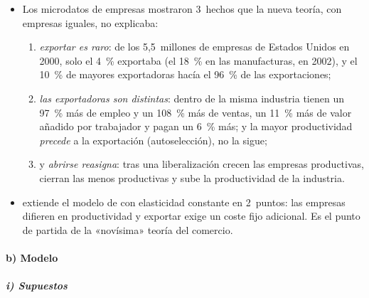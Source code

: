 \documentclass[11pt]{article}
\begin{document}
\begin{itemize}
\item Los microdatos de empresas mostraron 3~hechos que la nueva teoría, con empresas iguales, no explicaba:
  \begin{enumerate}
  \item \emph{exportar es raro}: de los 5,5~millones de empresas de Estados Unidos en 2000, solo el 4~\% exportaba (el 18~\% en las manufacturas, en 2002), y el 10~\% de mayores exportadoras hacía el 96~\% de las exportaciones\nocite{BernardJensenReddingSchott2007Firms};
  \item \emph{las exportadoras son distintas}: dentro de la misma industria tienen un 97~\% más de empleo y un 108~\% más de ventas, un 11~\% más de valor añadido por trabajador y pagan un 6~\% más; y la mayor productividad \emph{precede} a la exportación (autoselección), no la sigue\nocite{BernardJensenReddingSchott2007Firms};
  \item y \emph{abrirse reasigna}: tras una liberalización crecen las empresas productivas, cierran las menos productivas y sube la productividad de la industria\nocite{Trefler2004Long}.
  \end{enumerate}
\item \textcite{Melitz2003Impact} extiende el modelo de  con elasticidad constante en 2~puntos: las empresas difieren en productividad y exportar exige un coste fijo adicional. Es el punto de partida de la «novísima» teoría del comercio.
\end{itemize}

\paragraph{b) Modelo}

\subparagraph{i) Supuestos}
\end{document}
